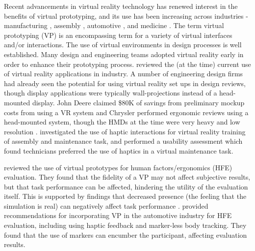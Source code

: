 Recent advancements in virtual reality technology has renewed interest in the benefits of virtual prototyping, and its use has been increasing across industries - manufacturing \citep{choi_virtual_2015}, assembly \citep{pontonnier_designing_2014}, automotive \citep{bordegoni_mixed_2012,lawson_future_2016}, and medicine \citep{nagendran_virtual_2013}.
The term virtual prototyping (VP) is an encompassing term for a variety of virtual interfaces and/or interactions.
The use of virtual environments in design processes is well established.
Many design and engineering teams adopted virtual reality early in order to enhance their prototyping process.
\citet{brooks_jr_whats_1999} reviewed the (at the time) current use of virtual reality applications in industry.
A number of engineering design firms had already seen the potential for using virtual reality set ups in design reviews, though display applications were typically wall-projections instead of a head-mounted display.
John Deere claimed \$80K of savings from preliminary mockup costs from using a VR system and Chrysler performed ergonomic reviews using a head-mounted system, though the HMDs at the time were very heavy and low resolution \citep{brooks_jr_whats_1999}.
\citet{abate_haptic-based_2009} investigated the use of haptic interactions for virtual reality training of assembly and maintenance task, and performed a usability assessment which found technicians preferred the use of haptics in a virtual maintenance task.

\citet{aromaa_suitability_2016} reviewed the use of virtual prototypes for human factors/ergonomics (HFE) evaluation.
They found that the fidelity of a VP may not affect subjective results, but that task performance can be affected, hindering the utility of the evaluation itself.
This is supported by findings that decreased presence (the feeling that the simulation is real) can negatively affect task performance \citep{youngblut_relationship_2003}.
\citet{lawson_future_2016} provided recommendations for incorporating VP in the automotive industry for HFE evaluation, including using haptic feedback and marker-less body tracking.
They found that the use of markers can encumber the participant, affecting evaluation results.

